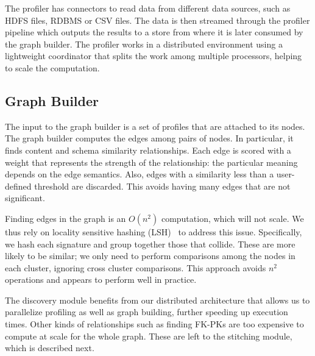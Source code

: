 The profiler has connectors to read data from different data sources, such as HDFS files, RDBMS or CSV files. The data is then streamed through the profiler pipeline
which outputs the results
to a store from where it is later consumed by the graph builder.
The profiler works in a distributed environment using a lightweight coordinator that splits the work among multiple processors, helping to scale the computation.



\subsection{Graph Builder}



The input to the graph builder is a set of profiles that are attached to its nodes. The graph builder computes the edges among pairs of nodes. In particular, it finds content and schema similarity relationships. Each edge is scored with a weight that represents the strength of the relationship: the particular meaning depends on the edge semantics.  Also, edges with a similarity less than a user-defined threshold are discarded.
This avoids having many edges that are not significant.


Finding edges in the graph is an $O(n^2)$ computation, which will not scale.  We thus rely on locality sensitive hashing (LSH)~\cite{DBLP:conf/compgeom/DatarIIM04} to address this issue. Specifically, we hash each signature and group together those that collide.  These are more likely to be similar; we only need to perform comparisons among the nodes in each cluster, ignoring cross cluster comparisons.  This approach avoids $n^2$ operations and appears to perform well in practice.


The discovery module benefits from our distributed architecture that allows us to parallelize profiling as well as graph building, further speeding up execution times. Other kinds of relationships such as finding FK-PKs are too expensive to compute at scale for the whole graph.  These are left to the stitching module, which is described next.


